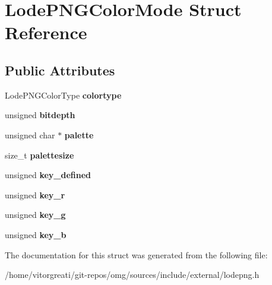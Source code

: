 \hypertarget{struct_lode_p_n_g_color_mode}{}\section{Lode\+P\+N\+G\+Color\+Mode Struct Reference}
\label{struct_lode_p_n_g_color_mode}
\subsection*{Public Attributes}
\begin{DoxyCompactItemize}
\item 
\mbox{\label{struct_lode_p_n_g_color_mode_a4f3df7240411abe80546052d197fbe8d}} 
Lode\+P\+N\+G\+Color\+Type {\bfseries colortype}
\item 
\mbox{\label{struct_lode_p_n_g_color_mode_ad20010b9561980f65281bc17f7848253}} 
unsigned {\bfseries bitdepth}
\item 
\mbox{\label{struct_lode_p_n_g_color_mode_a54f0a793238009fcb95f081626fae308}} 
unsigned char $\ast$ {\bfseries palette}
\item 
\mbox{\label{struct_lode_p_n_g_color_mode_a407557f056168682d9319aeb60866dcc}} 
size\+\_\+t {\bfseries palettesize}
\item 
\mbox{\label{struct_lode_p_n_g_color_mode_ab9105505c5d56cfc6ce4efe1bb288b54}} 
unsigned {\bfseries key\+\_\+defined}
\item 
\mbox{\label{struct_lode_p_n_g_color_mode_a29e64327bca1f3d16235e9ff471e4d50}} 
unsigned {\bfseries key\+\_\+r}
\item 
\mbox{\label{struct_lode_p_n_g_color_mode_ad98309f36d289392b0c440baa50af9f6}} 
unsigned {\bfseries key\+\_\+g}
\item 
\mbox{\label{struct_lode_p_n_g_color_mode_a93a269405fee0d1c5045a1a671ed1de8}} 
unsigned {\bfseries key\+\_\+b}
\end{DoxyCompactItemize}


The documentation for this struct was generated from the following file\+:\begin{DoxyCompactItemize}
\item 
/home/vitorgreati/git-\/repos/omg/sources/include/external/lodepng.\+h\end{DoxyCompactItemize}
